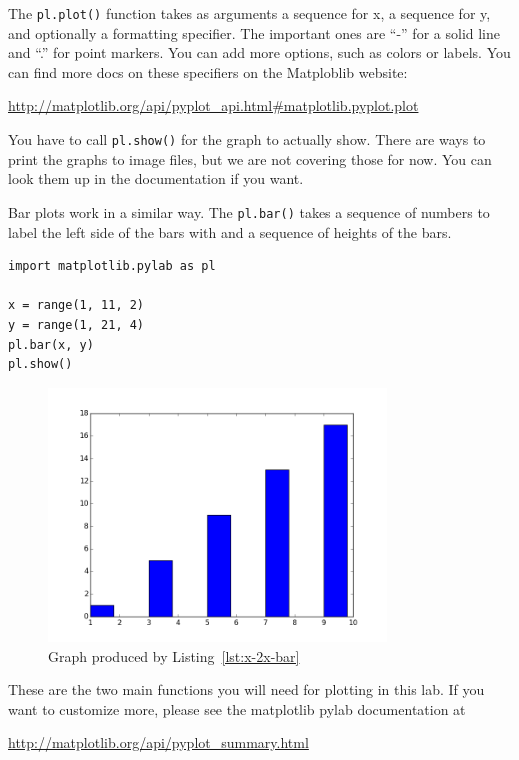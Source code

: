 \documentclass[11pt]{cselabheader}
\begin{document}
The \lstinline!pl.plot()! function takes as arguments a sequence for x, a
sequence for y, and optionally a formatting specifier. The important ones are
``-'' for a solid line and ``.'' for point markers. You can add more options,
such as colors or labels. You can find more docs on
these specifiers on the Matploblib website:
\begin{center}
  \url{http://matplotlib.org/api/pyplot_api.html#matplotlib.pyplot.plot}
\end{center}

You have to call \lstinline!pl.show()! for the graph to actually show. There are
ways to print the graphs to image files, but we are not covering those for now.
You can look them up in the documentation if you want.

Bar plots work in a similar way. The \lstinline!pl.bar()! takes a sequence of
numbers to label the left side of the bars with and a sequence of heights of the
bars.

\begin{lstlisting}[caption={Code to produce Figure~\ref{fig:x-2x-bar}},label={lst:x-2x-bar}]
import matplotlib.pylab as pl

x = range(1, 11, 2)
y = range(1, 21, 4)
pl.bar(x, y)
pl.show()
\end{lstlisting}

\begin{figure}[!ht]
  \centering
  \includegraphics[width=0.8\textwidth]{lab11/x-2x-bar-plot.png}
  \caption{Graph produced by Listing~\ref{lst:x-2x-bar}}
  \label{fig:x-2x-bar}
\end{figure}

These are the two main functions you will need for plotting in this lab. If you
want to customize more, please see the matplotlib pylab documentation at
\begin{center}
  \url{http://matplotlib.org/api/pyplot_summary.html}
\end{center}
\end{document}

